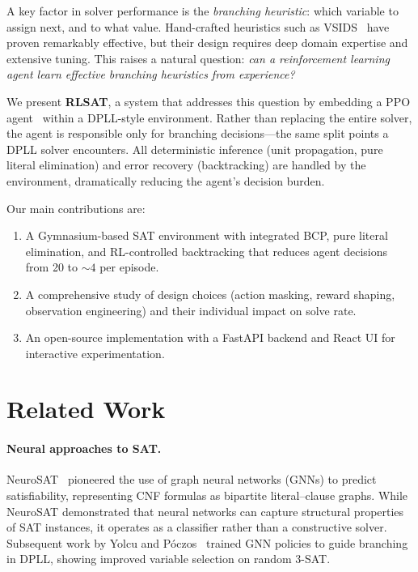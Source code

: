 \documentclass{article}
\begin{document}
A key factor in solver performance is the \emph{branching heuristic}: which variable to assign next, and to what value. Hand-crafted heuristics such as VSIDS~\cite{moskewicz2001chaff} have proven remarkably effective, but their design requires deep domain expertise and extensive tuning. This raises a natural question: \emph{can a reinforcement learning agent learn effective branching heuristics from experience?}

We present \textbf{RLSAT}, a system that addresses this question by embedding a PPO agent~\cite{schulman2017proximal} within a DPLL-style environment. Rather than replacing the entire solver, the agent is responsible only for branching decisions---the same split points a DPLL solver encounters. All deterministic inference (unit propagation, pure literal elimination) and error recovery (backtracking) are handled by the environment, dramatically reducing the agent's decision burden.

Our main contributions are:
\begin{enumerate}
    \item A Gymnasium-based SAT environment with integrated BCP, pure literal elimination, and RL-controlled backtracking that reduces agent decisions from 20 to ${\sim}4$ per episode.
    \item A comprehensive study of design choices (action masking, reward shaping, observation engineering) and their individual impact on solve rate.
    \item An open-source implementation with a FastAPI backend and React UI for interactive experimentation.
\end{enumerate}

\section{Related Work}

\paragraph{Neural approaches to SAT.}
NeuroSAT~\cite{selsam2019learning} pioneered the use of graph neural networks (GNNs) to predict satisfiability, representing CNF formulas as bipartite literal--clause graphs. While NeuroSAT demonstrated that neural networks can capture structural properties of SAT instances, it operates as a classifier rather than a constructive solver. Subsequent work by Yolcu and P\'oczos~\cite{yolcu2019learning} trained GNN policies to guide branching in DPLL, showing improved variable selection on random 3-SAT.
\end{document}
